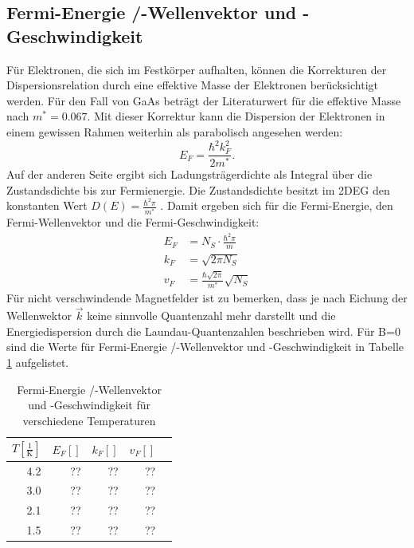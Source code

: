 \documentclass[paper=a4,fontsize=10pt,DIV=18,twocolumn,parskip=half]{scrartcl}
\numberwithin{equation}{section}    %
\begin{document}
\subsection{Fermi-Energie /-Wellenvektor und -Geschwindigkeit}
\label{a5}
Für Elektronen, die sich im Festkörper aufhalten, können die Korrekturen der Dispersionsrelation durch eine effektive Masse der Elektronen berücksichtigt werden. Für den Fall von GaAs beträgt der Literaturwert für die effektive Masse nach \cite{saarland} $m^*=0.067$. Mit dieser Korrektur kann die Dispersion der Elektronen in einem gewissen Rahmen weiterhin als parabolisch angesehen werden:
\begin{equation}
E_F=\frac{\hbar^2 k_F^2}{2 m^*}.
\end{equation}
Auf der anderen Seite ergibt sich Ladungsträgerdichte als Integral über die Zustandsdichte bis zur Fermienergie. Die Zustandsdichte besitzt im 2DEG den konstanten Wert $D(E)=\frac{\hbar^2 \pi}{m^*}$ \citep{anleitung}.
Damit ergeben sich für die Fermi-Energie, den Fermi-Wellenvektor und die Fermi-Geschwindigkeit:
\begin{align}
E_F&=N_S \cdot \frac{\hbar^2 \pi}{m}\\
k_F&=\sqrt{2 \pi N_S}\\
v_F&=\frac{\hbar\sqrt{2 \pi}}{m^*} \sqrt{N_S}
\end{align}
Für nicht verschwindende Magnetfelder ist zu bemerken, dass je nach Eichung der Wellenwektor $\vec{k}$ keine sinnvolle Quantenzahl mehr darstellt und die Energiedispersion durch die Laundau-Quantenzahlen beschrieben wird.
Für B=0 sind die Werte für Fermi-Energie /-Wellenvektor und -Geschwindigkeit in Tabelle \ref{fermitabelle} aufgelistet.

\begin{table}[htp]
	\begin{center}
		\begin{tabular}{rrrrr}
			\hline
			$T[\frac{1}{\mathrm{K}}]$ & $E_F[]$ & $k_F[]$ & $v_F[]$\\
			\hline
			4.2 &??&??&??\\
			3.0 &??&??&??\\
			2.1 &??&??&??\\
			1.5 &??&??&??\\
			\hline
		\end{tabular}
		\caption{Fermi-Energie /-Wellenvektor und -Geschwindigkeit für verschiedene Temperaturen}
		\label{fermitabelle}
	\end{center}
\end{table}
%
~~~~~~~~~~~~~~~~~~~~~~~~~~~~~~~~~~~~~~~~~~~~~~~~~~~~~~~~~~~~~~~~~~~~~~~~~~~~~
\end{document}

